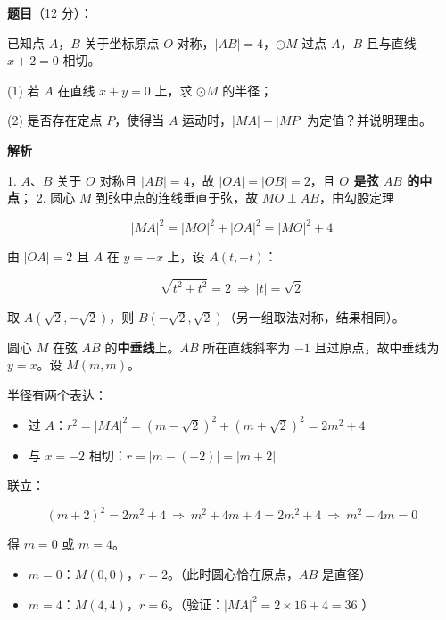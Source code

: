 \begin{answer}

\textbf{题目}（12 分）：

已知点 $A$，$B$ 关于坐标原点 $O$ 对称，$|AB|=4$，$\odot M$ 过点 $A$，$B$ 且与直线 $x+2=0$ 相切。

  (1) 若 $A$ 在直线 $x+y=0$ 上，求 $\odot M$ 的半径；

  (2) 是否存在定点 $P$，使得当 $A$ 运动时，$|MA|-|MP|$ 为定值？并说明理由。

\Needspace{0.6\textheight}

\textbf{解析}


1. $A$、$B$ 关于 $O$ 对称且 $|AB|=4$，故 $|OA|=|OB|=2$，且 \textbf{$O$ 是弦 $AB$ 的中点}；
2. 圆心 $M$ 到弦中点的连线垂直于弦，故 $MO\perp AB$，由勾股定理

\nopagebreak[4]
\[|MA|^{2}=|MO|^{2}+|OA|^{2}=|MO|^{2}+4\]


由 $|OA|=2$ 且 $A$ 在 $y=-x$ 上，设 $A(t,-t)$：

\nopagebreak[4]
\[\sqrt{t^{2}+t^{2}}=2\ \Longrightarrow\ |t|=\sqrt2\]

取 $A\left(\sqrt2,-\sqrt2\right)$，则 $B\left(-\sqrt2,\sqrt2\right)$（另一组取法对称，结果相同）。

圆心 $M$ 在弦 $AB$ 的\textbf{中垂线}上。$AB$ 所在直线斜率为 $-1$ 且过原点，故中垂线为 $y=x$。设 $M(m,m)$。

半径有两个表达：

\begin{itemize}
\item 过 $A$：$r^{2}=|MA|^{2}=\left(m-\sqrt2\right)^{2}+\left(m+\sqrt2\right)^{2}=2m^{2}+4$
\item 与 $x=-2$ 相切：$r=|m-(-2)|=|m+2|$
\end{itemize}

联立：

\nopagebreak[4]
\[(m+2)^{2}=2m^{2}+4\ \Longrightarrow\ m^{2}+4m+4=2m^{2}+4\ \Longrightarrow\ m^{2}-4m=0\]

得 $m=0$ 或 $m=4$。

\begin{itemize}
\item $m=0$：$M(0,0)$，$r=2$。（此时圆心恰在原点，$AB$ 是直径）
\item $m=4$：$M(4,4)$，$r=6$。（验证：$|MA|^{2}=2\times16+4=36$ ）
\end{itemize}


\end{answer}
